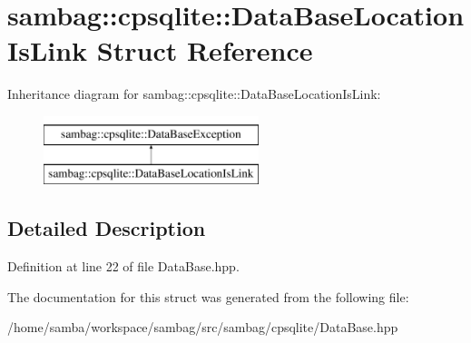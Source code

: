 \hypertarget{structsambag_1_1cpsqlite_1_1_data_base_location_is_link}{
\section{sambag::cpsqlite::DataBaseLocationIsLink Struct Reference}
\label{structsambag_1_1cpsqlite_1_1_data_base_location_is_link}
}
Inheritance diagram for sambag::cpsqlite::DataBaseLocationIsLink:\begin{figure}[H]
\begin{center}
\leavevmode
\includegraphics[height=2.000000cm]{structsambag_1_1cpsqlite_1_1_data_base_location_is_link}
\end{center}
\end{figure}


\subsection{Detailed Description}


Definition at line 22 of file DataBase.hpp.



The documentation for this struct was generated from the following file:\begin{DoxyCompactItemize}
\item 
/home/samba/workspace/sambag/src/sambag/cpsqlite/DataBase.hpp\end{DoxyCompactItemize}
